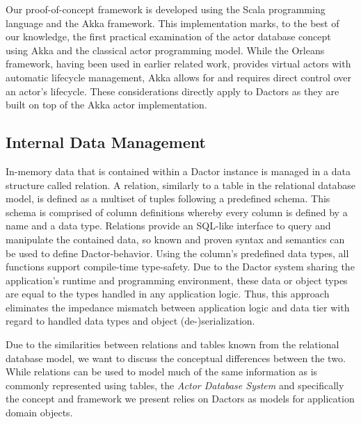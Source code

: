 Our proof-of-concept framework is developed using the Scala programming language and the Akka framework.
This implementation marks, to the best of our knowledge, the first practical examination of the actor database concept using Akka and the classical actor programming model.
While the Orleans framework, having been used in earlier related work, provides virtual actors with automatic lifecycle management, Akka allows for and requires direct control over an actor's lifecycle.
These considerations directly apply to Dactors as they are built on top of the Akka actor implementation.

\subsection{Internal Data Management}

In-memory data that is contained within a Dactor instance is managed in a data structure called relation.
A relation, similarly to a table in the relational database model, is defined as a multiset of tuples following a predefined schema.
This schema is comprised of column definitions whereby every column is defined by a name and a data type.
Relations provide an SQL-like interface to query and manipulate the contained data, so known and proven syntax and semantics can be used to define Dactor-behavior.
Using the column's predefined data types, all functions support compile-time type-safety.
Due to the Dactor system sharing the application's runtime and programming environment, these data or object types are equal to the types handled in any application logic.
Thus, this approach eliminates the impedance mismatch between application logic and data tier with regard to handled data types and object (de-)serialization.

Due to the similarities between relations and tables known from the relational database model, we want to discuss the conceptual differences between the two.
While relations can be used to model much of the same information as is commonly represented using tables, the \textit{Actor Database System} and specifically the concept and framework we present relies on Dactors as models for application domain objects.

